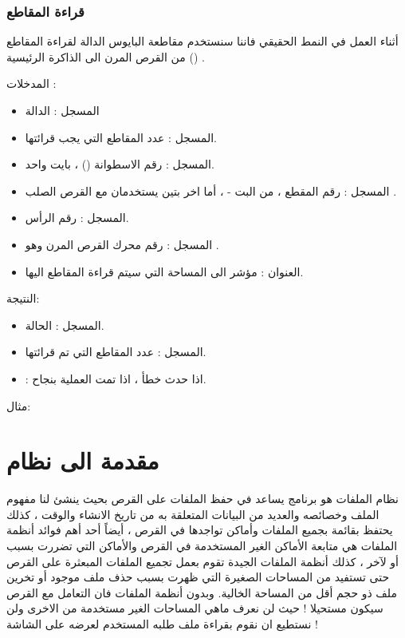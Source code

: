 \documentclass[document.tex]{subfiles}
\begin{document}
\subsubsection{قراءة المقاطع }
أثناء العمل في النمط الحقيقي فاننا سنستخدم مقاطعة البايوس  الدالة  لقراءة المقاطع () من القرص المرن الى الذاكرة الرئيسية  .

المدخلات :
\begin{itemize}
\item المسجل : الدالة 
\item المسجل : عدد المقاطع التي يجب قرائتها.
\item المسجل : رقم الاسطوانة  () ، بايت واحد.
\item المسجل : رقم المقطع ، من البت  -  ، أما اخر بتين يستخدمان مع القرص الصلب .
\item المسجل : رقم الرأس.
\item المسجل  : رقم محرك القرص المرن وهو .
\item العنوان  : مؤشر الى المساحة التي سيتم قراءة المقاطع اليها.
\end{itemize}
النتيجة:
\begin{itemize}
\item المسجل  : الحالة.
\item المسجل : عدد المقاطع التي تم قرائتها.
\item {} :  اذا حدث خطأ ،  اذا تمت العملية بنجاح.

\end{itemize}

مثال:\\
\begin{english}
\lstset{numberstyle=\tiny,numbers=left,stepnumber=1,numbersep=5pt,tabsize=2,extendedchars=true,breaklines=true,frame=b,showspaces=false, showtabs=false,xleftmargin=10pt,framexleftmargin=10pt,framexrightmargin=5pt,framexbottommargin=4pt,showstringspaces=false,language=[x86masm]Assembler}


\end{english}


\section{مقدمة الى نظام }
نظام الملفات هو برنامج يساعد في حفظ الملفات على القرص بحيث ينشئ لنا مفهوم الملف وخصائصه والعديد من البيانات المتعلقة به من تاريخ الانشاء والوقت ، كذلك يحتفظ بقائمة بجميع الملفات وأماكن تواجدها في القرص ، أيضاً أحد أهم فوائد أنظمة الملفات هي متابعة الأماكن الغير المستخدمة في القرص والأماكن التي تضررت بسبب أو لآخر  ، كذلك أنظمة الملفات الجيدة تقوم بعمل تجميع الملفات المبعثرة على القرص  حتى تستفيد من المساحات الصغيرة التي ظهرت بسبب حذف ملف موجود أو تخرين ملف ذو حجم أقل من المساحة الخالية.
وبدون أنظمة الملفات فان التعامل مع القرص سيكون مستحيلا ! حيث لن نعرف ماهي المساحات الغير مستخدمة من الاخرى ولن نستطيع ان نقوم بقراءة ملف طلبه المستخدم لعرضه على الشاشة !
\end{document}

